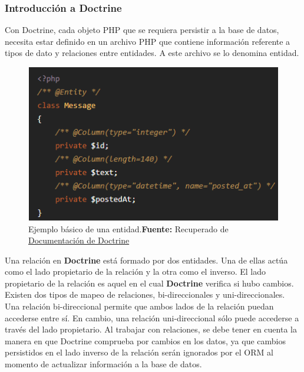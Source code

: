 \subsubsection{Introducción a Doctrine}%
\label{ssub:introducción_doctrine}
Con Doctrine, cada objeto PHP que se requiera persistir a la base de datos, necesita estar definido en un archivo PHP que
contiene información referente a tipos de dato y relaciones entre entidades. A este archivo se lo denomina entidad.

\begin{figure}[h]
    \includegraphics[width=1\linewidth]{image/entidad-doctrine.png}
    \caption{Ejemplo básico de una entidad.\newline \textbf{Fuente:} Recuperado de \href{https://www.doctrine-project.org/
    projects/doctrine-orm/en/2.6/reference/basic-mapping.html}{Documentación de Doctrine}}%
    \label{fig:image/entidad-doctrine}
\end{figure}
Una relación en \textbf{Doctrine} está formado por dos entidades. Una de ellas actúa como el lado propietario de la relación y la otra como el inverso\@.
El lado propietario de la relación es aquel en el cual \textbf{Doctrine} verifica si hubo cambios.
Existen dos tipos de mapeo de relaciones, bi-direccionales y uni-direccionales\@.
Una relación bi-direccional permite que ambos lados de la relación puedan accederse entre sí\@. En cambio, una relación uni-direccional sólo puede accederse
a través del lado propietario\@.
Al trabajar con relaciones, se debe tener en cuenta la manera en que Doctrine comprueba por cambios en los datos, ya que cambios persistidos en el lado
inverso de la relación serán ignorados por el ORM al momento de actualizar información a la base de datos.



